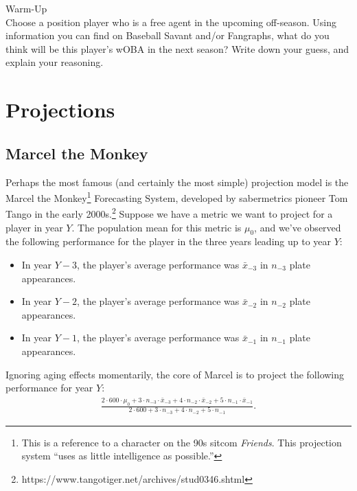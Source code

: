 \documentclass{article}
\begin{document}
  \begin{framed}
    {\sc Warm-Up}\\
    Choose a position player who is a free agent in the upcoming off-season. Using information you can find on Baseball Savant and/or Fangraphs, what do you think will be this player's wOBA in the next season? Write down your guess, and explain your reasoning.
  \end{framed}

  \setcounter{section}{6}
  \section{\sc Projections}
  
    \subsection{\sc Marcel the Monkey}
  
      Perhaps the most famous (and certainly the most simple) projection model is the Marcel the Monkey\footnote{This is a reference to a character on the 90s sitcom {\it Friends}. This projection system ``uses as little intelligence as possible.''} Forecasting System, developed by sabermetrics pioneer Tom Tango in the early 2000s.\footnote{https://www.tangotiger.net/archives/stud0346.shtml} Suppose we have a metric we want to project for a player in year $Y$. The population mean for this metric is $\mu_0$, and we've observed the following performance for the player in the three years leading up to year $Y$:
      \begin{itemize}
        \item In year $Y - 3$, the player's average performance was $\bar x_{-3}$ in $n_{-3}$ plate appearances.
        \item In year $Y - 2$, the player's average performance was $\bar x_{-2}$ in $n_{-2}$ plate appearances.
        \item In year $Y - 1$, the player's average performance was $\bar x_{-1}$ in $n_{-1}$ plate appearances.
      \end{itemize}
  
      Ignoring aging effects momentarily, the core of Marcel is to project the following performance for year $Y$:
      \begin{align}
        \label{eqn:marcel}
        \frac
          {2 \cdot 600 \cdot \mu_0 + 3 \cdot n_{-3} \cdot \bar x_{-3} + 4 \cdot n_{-2} \cdot \bar x_{-2} + 5 \cdot n_{-1} \cdot \bar x_{-1}}
          {2 \cdot 600 + 3 \cdot n_{-3} + 4 \cdot n_{-2} + 5 \cdot n_{-1}}.
      \end{align}
  
\end{document}
